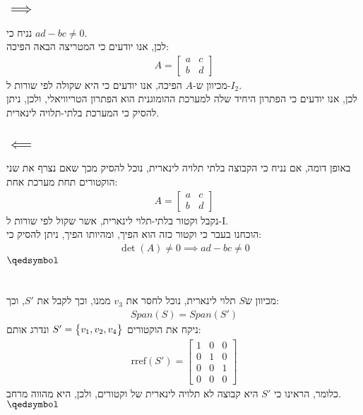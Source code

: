 \documentclass[a4paper, 12pt, leqno]{article}
\newcommand{\sub}[1]{\subsection{\underline{#1}}}
\newcommand{\eq}[1]{\begin{align*}#1\end{align*}}
\newcommand{\set}[1]{\big{\{} #1 \big{\}}}
\renewcommand{\qed}{\hfill\(\qedsymbol\)}
\begin{document}
\setcounter{section}{19}
\section{}
\sub{$\implies$}
נניח כי $ad-bc\neq0$.\\
לכן, אנו יודעים כי המטריצה הבאה הפיכה:
\eq{
    A=
    \begin{bmatrix}
        a & c\\ b & d
    \end{bmatrix}
}
מכיוון ש-$A$ הפיכה, אנו יודעים כי היא שקולה לפי שורות ל-$I_2$.\\
לכן, אנו יודעים כי הפתרון היחיד שלה למערכת ההומוגנית הוא הפתרון הטריוויאלי, ולכן,
ניתן להסיק כי המערכת בלתי-תלויה לינארית.
\sub{$\impliedby$}
באופן דומה, אם נניח כי הקבוצה בלתי תלויה לינארית, נוכל להסיק מכך שאם נצרף את שני הוקטורים תחת מערכת אחת:
\eq{
    A=
    \begin{bmatrix}
        a & c\\ b & d
    \end{bmatrix}
}
נקבל וקטור בלתי-תלוי לינארית, אשר שקול לפי שורות ל-I.\\
הוכחנו בעבר כי וקטור כזה הוא הפיך, ומהיותו הפיך, ניתן להסיק כי:
\eq{
    \det(A)\neq{0}\implies ad-bc\neq0
}
\qed

\pagebreak
\setcounter{section}{21}
\section{}
מכיוון ש$S$ תלוי לינארית, נוכל לחסר את $v_3$ ממנו, וכך לקבל את $S'$, וכך:
\eq{
    Span(S)=Span(S')
}
ניקח את הוקטורים $S'=\set{v_1,v_2,v_4}$ ונדרג אותם:
\eq{
    \text{rref}(S')=
    \begin{bmatrix}
        1 & 0 & 0\\
        0 & 1 & 0\\
        0 & 0 & 1\\
        0 & 0 & 0
    \end{bmatrix}
}
כלומר, הראינו כי $S'$ היא קבוצה לא תלויה לינארית של וקטורים, ולכן, היא מהווה מרחב.
\qed

\setcounter{section}{26}
\end{document}
